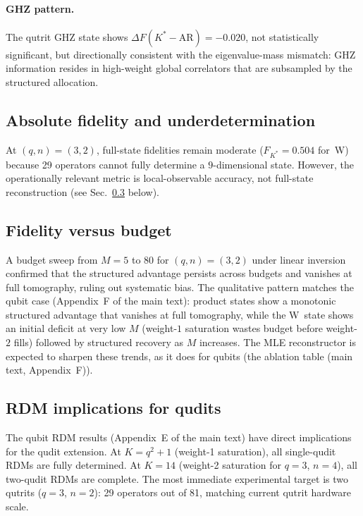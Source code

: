 \documentclass[twocolumn,prx,aps,superscriptaddress,longbibliography]{revtex4-2}
\begin{document}
\paragraph{GHZ pattern.}
The qutrit GHZ state shows
$\Delta F(K^*{-}\mathrm{AR}) = -0.020$, not statistically
significant, but directionally consistent with the eigenvalue-mass
mismatch: GHZ information resides in high-weight global correlators
that are subsampled by the structured allocation.

\subsection{Absolute fidelity and underdetermination}

At $(q,n) = (3,2)$, full-state fidelities remain moderate
($F_{K^*} = 0.504$ for~W) because 29 operators cannot fully
determine a $9$-dimensional state.  However, the operationally
relevant metric is local-observable accuracy, not full-state
reconstruction (see Sec.~\ref{sec:qudit-rdm} below).

\subsection{Fidelity versus budget}
\label{sec:budget}

A budget sweep from $M = 5$ to 80 for $(q,n) = (3,2)$ under
linear inversion confirmed that the structured advantage persists
across budgets and vanishes at full tomography, ruling out
systematic bias.  The qualitative pattern matches the qubit case
(Appendix~F of the main text): product states show a monotonic
structured advantage that vanishes at full tomography, while the
W~state shows an initial deficit at very low $M$ (weight-$1$
saturation wastes budget before weight-$2$ fills) followed by
structured recovery as $M$ increases.  The MLE reconstructor is
expected to sharpen these trends, as it does for qubits
(the ablation table (main text, Appendix~F)).

\subsection{RDM implications for qudits}
\label{sec:qudit-rdm}

The qubit RDM results (Appendix~E of the main text) have direct
implications for the qudit extension.  At $K = q^2 + 1$ (weight-1
saturation), all single-qudit RDMs are fully determined.  At
$K = 14$ (weight-2 saturation for $q = 3$, $n = 4$), all
two-qudit RDMs are complete.  The most immediate experimental
target is two qutrits ($q = 3$, $n = 2$): 29 operators out of 81,
matching current qutrit hardware scale.
\end{document}
